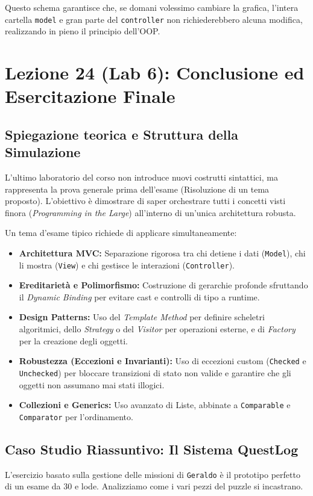 \documentclass[12pt, a4paper]{article}
\begin{document}
Questo schema garantisce che, se domani volessimo cambiare la grafica, l'intera cartella \texttt{model} e gran parte del \texttt{controller} non richiederebbero alcuna modifica, realizzando in pieno il principio dell'OOP.


\section{Lezione 24 (Lab 6): Conclusione ed Esercitazione Finale}

\subsection{Spiegazione teorica e Struttura della Simulazione}
L'ultimo laboratorio del corso non introduce nuovi costrutti sintattici, ma rappresenta la prova generale prima dell'esame (Risoluzione di un tema proposto). L'obiettivo è dimostrare di saper orchestrare tutti i concetti visti finora (\textit{Programming in the Large}) all'interno di un'unica architettura robusta.

Un tema d'esame tipico richiede di applicare simultaneamente:
\begin{itemize}
    \item \textbf{Architettura MVC:} Separazione rigorosa tra chi detiene i dati (\texttt{Model}), chi li mostra (\texttt{View}) e chi gestisce le interazioni (\texttt{Controller}).
    \item \textbf{Ereditarietà e Polimorfismo:} Costruzione di gerarchie profonde sfruttando il \textit{Dynamic Binding} per evitare cast e controlli di tipo a runtime.
    \item \textbf{Design Patterns:} Uso del \textit{Template Method} per definire scheletri algoritmici, dello \textit{Strategy} o del \textit{Visitor} per operazioni esterne, e di \textit{Factory} per la creazione degli oggetti.
    \item \textbf{Robustezza (Eccezioni e Invarianti):} Uso di eccezioni custom (\texttt{Checked} e \texttt{Unchecked}) per bloccare transizioni di stato non valide e garantire che gli oggetti non assumano mai stati illogici.
    \item \textbf{Collezioni e Generics:} Uso avanzato di Liste, abbinate a \texttt{Comparable} e \texttt{Comparator} per l'ordinamento.
\end{itemize}

\subsection{Caso Studio Riassuntivo: Il Sistema QuestLog}
L'esercizio basato sulla gestione delle missioni di \texttt{Geraldo} è il prototipo perfetto di un esame da 30 e lode. Analizziamo come i vari pezzi del puzzle si incastrano.
\end{document}

